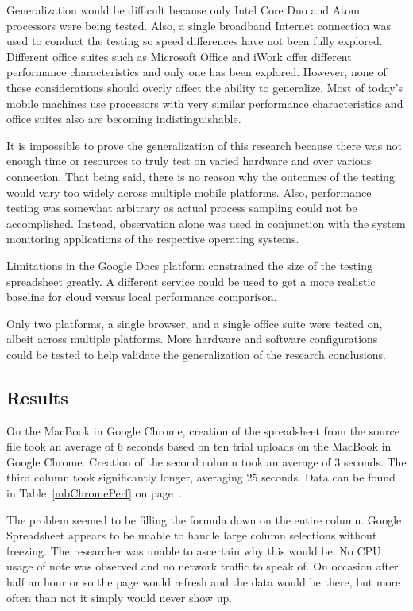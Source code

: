 
Generalization would be difficult because only Intel Core Duo and Atom
processors were being tested.  Also, a single broadband Internet connection was
used to conduct the testing so speed differences have not been fully explored.
Different office suites such as Microsoft Office and iWork offer different
performance characteristics and only one has been explored.  However, none of
these considerations should overly affect the ability to generalize.  Most of
today's mobile machines use processors with very similar performance
characteristics and office suites also are becoming indistinguishable.

It is impossible to prove the generalization of this research because there was
not enough time or resources to truly test on varied hardware and over various
connection.  That being said, there is no reason why the outcomes of the testing
would vary too widely across multiple mobile platforms.  Also, performance
testing was somewhat arbitrary as actual process sampling could not be
accomplished.  Instead, observation alone was used in conjunction with the
system monitoring applications of the respective operating systems.

Limitations in the Google Docs platform constrained the size of the testing
spreadsheet greatly.  A different service could be used to get a more realistic
baseline for cloud versus local performance comparison.

Only two platforms, a single browser, and a single office suite were tested on,
albeit across multiple platforms.  More hardware and software configurations
could be tested to help validate the generalization of the research conclusions.

\subsection{Results}

On the MacBook in Google Chrome, creation of the spreadsheet from the source
file took an average of 6 seconds based on ten trial uploads on the MacBook in
Google Chrome. Creation of the second column took an average of 3 seconds. The
third column took significantly longer, averaging 25 seconds. Data can be found
in Table~\ref{mbChromePerf} on page~\pageref{mbChromePerf}.



The problem seemed to be filling the formula down on the entire column.  Google
Spreadsheet appears to be unable to handle large column selections without
freezing.  The researcher was unable to ascertain why this would be.  No CPU
usage of note was observed and no network traffic to speak of.  On occasion
after half an hour or so the page would refresh and the data would be there, but
more often than not it simply would never show up.

